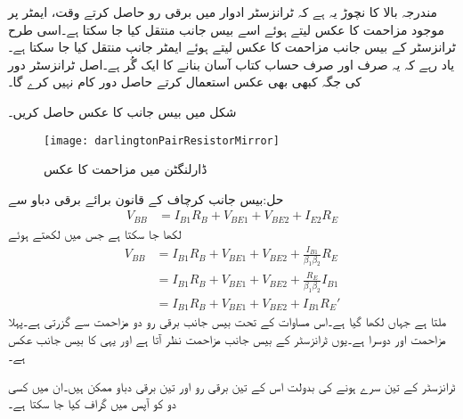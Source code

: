 مندرجہ بالا کا نچوڑ یہ ہے کہ ٹرانزسٹر ادوار میں برقی رو  حاصل کرتے وقت،  ایمٹر پر موجود مزاحمت کا عکس لیتے ہوئے اسے بیس جانب منتقل کیا جا سکتا ہے۔اسی طرح ٹرانزسٹر کے بیس جانب مزاحمت کا عکس لیتے ہوئے ایمٹر جانب منتقل کیا جا سکتا ہے۔یاد رہے کہ یہ صرف اور صرف حساب کتاب آسان بنانے کا ایک گُر ہے۔اصل ٹرانزسٹر دور کی جگہ کبھی بھی عکس استعمال کرتے حاصل دور کام نہیں کرے گا۔  

شکل  میں بیس جانب  کا عکس حاصل کریں۔
\begin{figure}
\centering
\texttt{[image: darlingtonPairResistorMirror]}
\caption{ڈارلنگٹن میں مزاحمت کا عکس}
\label{شکل_ٹرانزسٹر_ڈارلنگٹن_مزاحمت_عکس}
\end{figure}

حل:بیس جانب کرچاف کے قانون برائے برقی دباو سے
\begin{align*}
V_{BB}&=I_{B1} R_B +V_{BE1}+V_{BE2}+I_{E2} R_E
\end{align*}
لکھا جا سکتا ہے جس میں  لکھتے ہوئے
\begin{align*}
V_{BB}&=I_{B1} R_B +V_{BE1}+V_{BE2}+\frac{I_{B1}}{\beta_1 \beta_2} R_E\\
&=I_{B1} R_B +V_{BE1}+V_{BE2}+\frac{R_E}{\beta_1 \beta_2} I_{B1}\\
&=I_{B1} R_B +V_{BE1}+V_{BE2}+I_{B1} R_E'
\end{align*}
ملتا ہے جہاں  لکھا گیا ہے۔اس مساوات کے تحت بیس جانب برقی رو  دو مزاحمت سے گزرتی ہے۔پہلا مزاحمت  اور دوسرا  ہے۔یوں ٹرانزسٹر کے بیس جانب مزاحمت  نظر آتا ہے اور یہی  کا بیس جانب عکس ہے۔


\label{حصہ_ٹرانزسٹر_کے_خط}
	ٹرانزسٹر کے تین سرے ہونے کی بدولت اس کے تین برقی رو اور تین برقی دباو ممکن ہیں۔ان میں کسی دو کو آپس میں گراف کیا جا سکتا ہے۔

